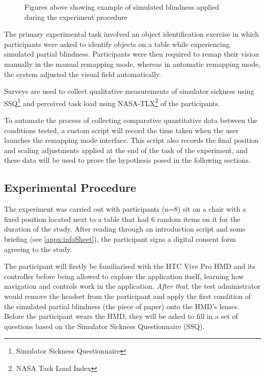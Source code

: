 \documentclass{l4proj}
\begin{document}
\begin{figure}[!h]
    \caption{Figures above showing example of simulated blindness applied during the experiment procedure} 
    \label{fig:SimHemianopia}

    
\end{figure}

The primary experimental task involved an object identification exercise in which participants were asked to identify objects on a table while experiencing simulated partial blindness. Participants were then required to remap their vision manually in the manual remapping mode, whereas in automatic remapping mode, the system adjusted the visual field automatically.

Surveys are used to collect qualitative measurements of simulator sickness using SSQ\footnote{Simulator Sickness Questionnaire} and perceived task load using NASA-TLX\footnote{NASA Task Load Index} of the participants. 

To automate the process of collecting comparative quantitative data between the conditions tested, a custom script will record the time taken when the user launches the remapping mode interface. This script also records the final position and scaling adjustments applied at the end of the task of the experiment, and these data will be used to prove the hypothesis posed in the following sections.


\subsection{Experimental Procedure}
The experiment was carried out with participants (n=8) sit on a chair with a fixed position located next to a table that had 6 random items on it for the duration of the study. After reading through an introduction script and some briefing (see \ref{appx:infoSheet}), the participant signs a digital consent form agreeing to the study.

The participant will firstly be familiarised with the HTC Vive Pro HMD and its controller before being allowed to explore the application itself, learning how navigation and controls work in the application. \textit{After that}, the test administrator would remove the headset from the participant and apply the first condition of the simulated partial blindness (the piece of paper) onto the HMD's lenses. Before the participant wears the HMD, they will be asked to fill in a set of questions based on the Simulator Sickness Questionnaire (SSQ).
\end{document}

